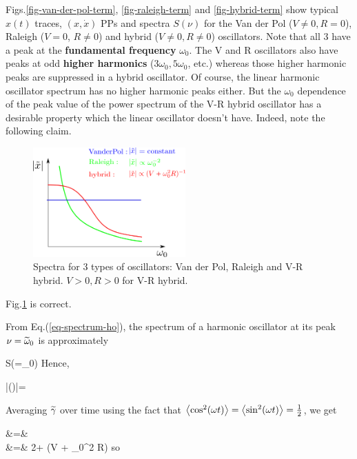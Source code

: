 Figs.\ref{fig-van-der-pol-term},
\ref{fig-raleigh-term}
and \ref{fig-hybrid-term}
show typical
$x(t)$ traces, $(x, \dot{x})$
PPs and spectra $S(\nu)$
for the Van der Pol ($V\neq 0,R=0$), Raleigh
($V=0$, $R\neq 0$) and hybrid  ($V\neq 0,R\neq 0$)
oscillators.
Note that all 3
have a peak at 
the {\bf fundamental frequency} $\omega_0$.
The V and R oscillators also have peaks   
at
odd {\bf higher harmonics} ($3\omega_0, 5\omega_0$, etc.)
whereas those higher harmonic peaks are
suppressed in a hybrid oscillator.
Of course, the linear harmonic oscillator
 spectrum has no higher harmonic peaks either.
But the $\omega_0$ dependence of
the peak value of the power spectrum of the V-R hybrid oscillator
has a desirable property which the linear oscillator doesn't have. Indeed, note the following claim. 


\begin{figure}[h!]
\centering
\includegraphics[width=2.3in]
{dynamical-sys/3-oscillator-spectra.png}
\caption{Spectra for 3 types of oscillators: Van der Pol, 
Raleigh and V-R hybrid.
$V>0, R>0$ for V-R hybrid.}
\label{fig-3-oscillator-spectra}
\end{figure}

\begin{claim}
Fig.\ref{fig-3-oscillator-spectra}  is correct.
\end{claim}
\proof

From Eq.(\ref{eq-spectrum-ho}), the
spectrum of a harmonic oscillator at its peak 
$\nu={\widetilde{\omega}}_0$ is approximately

\beq
S(\nu=\TIL{\omega}_0)\approx {}
\eeq
Hence, 

\beq
|(\nu)|=
\approx {}
\eeq

Averaging ${\widetilde{\gamma}}$ over time
using the fact that $\left\langle\cos^2(\omega t)\right\rangle
=\left\langle\sin^2(\omega t)\right\rangle=\frac{1}{2}$, we get


\beqa
\av{2\TIL{\gamma}} &=&
\\
&=& 
2\gamma + (V  + \omega_0^2 R)
\eeqa
so

